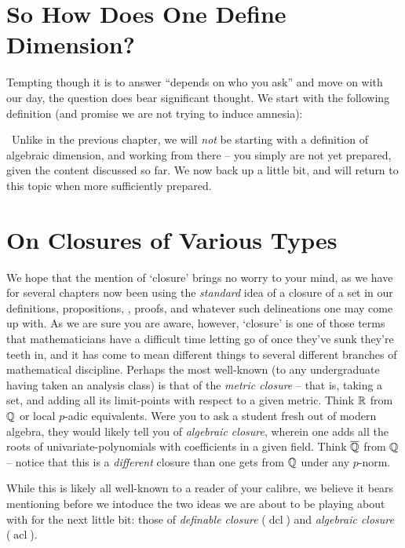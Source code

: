 \section{So How Does One Define Dimension?}
\label{sec:alg_dim}

\noindent Tempting though it is to answer ``depends on who you ask'' and move on with our day, the question does bear significant thought. We start with the following definition (and promise we are not trying to induce amnesia):

\begin{definition}
  \
  Unlike in the previous chapter, we will \emph{not} be starting with a definition of algebraic dimension, and working from there -- you simply are not yet prepared, given the content discussed so far. We now back up a little bit, and will return to this topic when more sufficiently prepared.
  \label{defn:alg_dim_fake}
\end{definition}

\section{On Closures of Various Types}
We hope that the mention of `closure' brings no worry to your mind, as we have for several chapters now been using the \emph{standard} idea of a closure of a set in our definitions, propositions, \lemmas, proofs, and whatever such delineations one may come up with. As we are sure you are aware, however, `closure' is one of those terms that mathematicians have a difficult time letting go of once they've sunk they're teeth in, and it has come to mean different things to several different branches of mathematical discipline. Perhaps the most well-known (to any undergraduate having taken an analysis class) is that of the \emph{metric closure} -- that is, taking a set, and adding all its limit-points with respect to a given metric. Think $\mathbb{R}$ from $\mathbb{Q}$ or local $p$-adic equivalents. Were you to ask a student fresh out of modern algebra, they would likely tell you of \emph{algebraic closure}, wherein one adds all the roots of univariate-polynomials with coefficients in a given field. Think $\overline{\mathbb{Q}}$ from $\mathbb{Q}$ -- notice that this is a \emph{different} closure than one gets from $\mathbb{Q}$ under any $p$-norm.

While this is likely all well-known to a reader of your calibre, we believe it bears mentioning before we intoduce the two ideas we are about to be playing about with for the next little bit: those of \emph{definable closure} ($\operatorname{dcl}$) and \emph{algebraic closure} ($\operatorname{acl}$).

